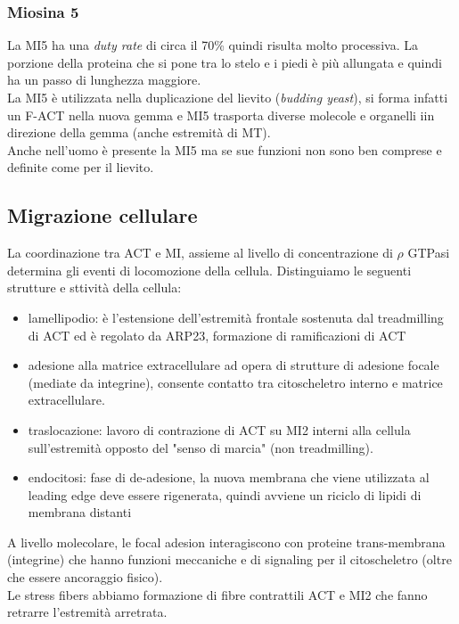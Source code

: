         \subsubsection{Miosina 5}
            La MI5 ha una \textit{duty rate} di circa il 70\% quindi risulta molto processiva. La porzione della proteina che si pone tra lo stelo e i piedi è più allungata e quindi ha un passo di lunghezza maggiore.\\
            La MI5 è utilizzata nella duplicazione del lievito (\textit{budding yeast}), si forma infatti un F-ACT nella nuova gemma e MI5 trasporta diverse molecole e organelli iin direzione della gemma (anche estremità di MT).\\
            Anche nell'uomo è presente la MI5 ma se sue funzioni non sono ben comprese e definite come per il lievito.
            
    \subsection{Migrazione cellulare}
        La coordinazione tra ACT e MI, assieme al livello di concentrazione di $\rho$ GTPasi determina gli eventi di locomozione della cellula. Distinguiamo le seguenti strutture e sttività della cellula:
        \begin{itemize}
            \item lamellipodio: è l'estensione dell'estremità frontale sostenuta dal treadmilling di ACT ed è regolato da ARP23, formazione di ramificazioni di ACT
            \item adesione alla matrice extracellulare ad opera di strutture di adesione focale (mediate da integrine), consente contatto tra citoscheletro interno e matrice extracellulare.
            \item traslocazione: lavoro di contrazione di ACT su MI2 interni alla cellula sull'estremità opposto del "senso di marcia" (non treadmilling).
            \item endocitosi: fase di de-adesione, la nuova membrana che viene utilizzata al leading edge deve essere rigenerata, quindi avviene un riciclo di lipidi di membrana distanti
        \end{itemize}
        
        A livello molecolare, le focal adesion interagiscono con proteine trans-membrana (integrine) che hanno funzioni meccaniche e di signaling per il citoscheletro (oltre che essere ancoraggio fisico). \\
        Le stress fibers abbiamo formazione di fibre contrattili ACT e MI2 che fanno retrarre l'estremità arretrata.
        

